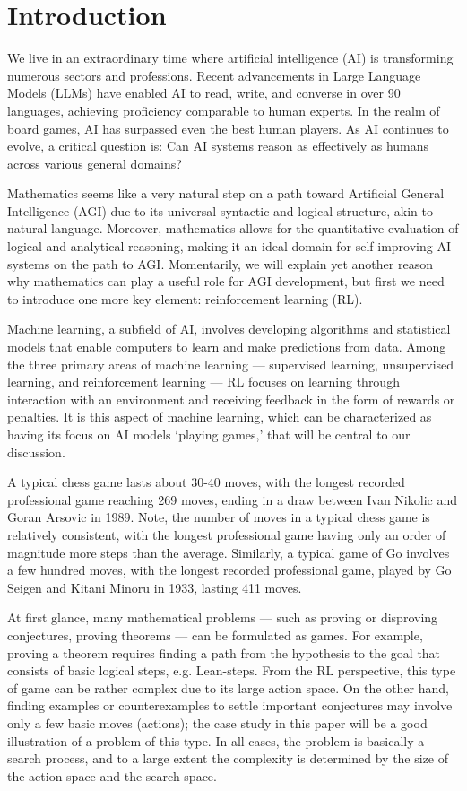 
\section{Introduction\label{sec:intro}}

We live in an extraordinary time where artificial intelligence (AI) is transforming numerous sectors and professions. Recent advancements in Large Language Models (LLMs) have enabled AI to read, write, and converse in over 90 languages, achieving proficiency comparable to human experts. In the realm of board games, AI has surpassed even the best human players. As AI continues to evolve, a critical question is: Can AI systems reason as effectively as humans across various general domains?

Mathematics seems like a very natural step on a path toward Artificial General Intelligence (AGI) due to its universal syntactic and logical structure, akin to natural language. Moreover, mathematics allows for the quantitative evaluation of logical and analytical reasoning, making it an ideal domain for self-improving AI systems on the path to AGI. Momentarily, we will explain yet another reason why mathematics can play a useful role for AGI development, but first we need to introduce one more key element: reinforcement learning (RL).

Machine learning, a subfield of AI, involves developing algorithms and statistical models that enable computers to learn and make predictions from data. Among the three primary areas of machine learning --- supervised learning, unsupervised learning, and reinforcement learning --- RL focuses on learning through interaction with an environment and receiving feedback in the form of rewards or penalties. It is this aspect of machine learning, which can be characterized as having its focus on AI models `playing games,' that will be central to our discussion.

A typical chess game lasts about 30-40 moves, with the longest recorded professional game reaching 269 moves, ending in a draw between Ivan Nikolic and Goran Arsovic in 1989. Note, the number of moves in a typical chess game is relatively consistent, with the longest professional game having only an order of magnitude more steps than the average. Similarly, a typical game of Go involves a few hundred moves, with the longest recorded professional game, played by Go Seigen and Kitani Minoru in 1933, lasting 411 moves.

At first glance, many mathematical problems --- such as proving or disproving conjectures, proving theorems --- can be formulated as games. For example, proving a theorem requires finding a path from the hypothesis to the goal that consists of basic logical steps, e.g. Lean-steps. From the RL perspective, this type of game can be rather complex due to its large action space. On the other hand, finding examples or counterexamples to settle important conjectures may involve only a few basic moves (actions); the case study in this paper will be a good illustration of a problem of this type. In all cases, the problem is basically a search process, and to a large extent the complexity is determined by the size of the action space and the search space.


